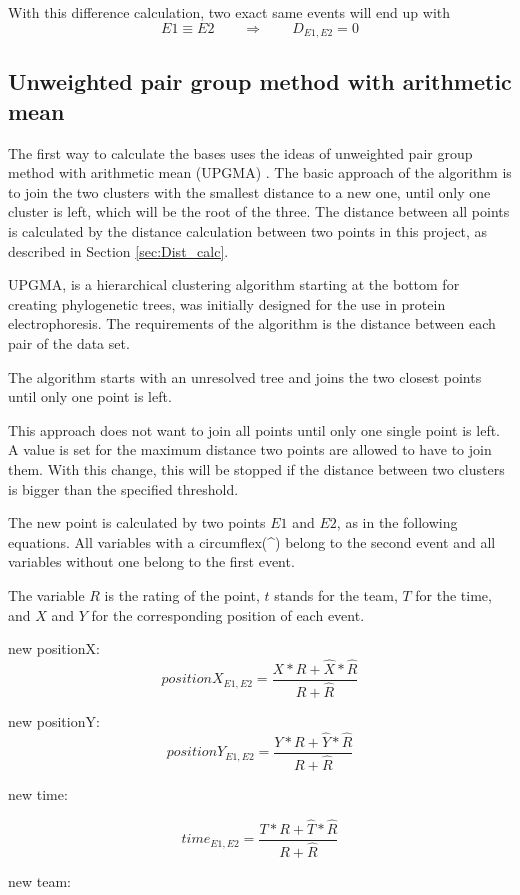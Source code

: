 With this difference calculation, two exact same events will end up with 
$$E1 \equiv E2 \qquad \Rightarrow \qquad D_{E1,E2}=0$$

\subsection{Unweighted pair group method with arithmetic mean}\label{subsec:UPGMA}

The first way to calculate the bases uses the ideas of unweighted pair group method with arithmetic mean (UPGMA) \cite{Sokal:1958}. The basic approach of the algorithm is to join the two clusters with the smallest distance to a new one, until only one cluster is left, which will be the root of the three.
The distance between all points is calculated by the distance calculation between two points in this project, as described in Section \ref{sec:Dist_calc}.

UPGMA, is a hierarchical clustering algorithm starting at the bottom for creating phylogenetic trees, was initially designed for the use in protein electrophoresis. The requirements of the algorithm is the distance between each pair of the data set.

The algorithm starts with an unresolved tree and joins the two closest points until only one point is left.

This approach does not want to join all points until only one single point is left. A value is set for the maximum distance two points are allowed to have to join them. With this change, this will be stopped if the distance between two clusters is bigger than the specified threshold.


The new point is calculated by two points $E1$ and $E2$, as in the following equations.
All variables with a circumflex(\^{}) belong to the second event and all variables without one belong to the first event.

The variable $R$ is the rating of the point, $t$ stands for the team, $T$ for the time, and $X$ and $Y$ for the corresponding position of each event.

new positionX:
$$
positionX_{E1,E2} = \frac{X * R + \hat{X} * \hat{R}} {R + \hat{R}}
$$


new positionY:
$$
positionY_{E1,E2} = \frac{Y * R + \hat{Y} * \hat{R}} {R + \hat{R}}$$

new time:

$$
time_{E1,E2} = \frac{T * R + \hat{T} * \hat{R}} {R + \hat{R}}$$


new team:

